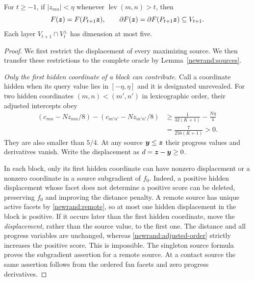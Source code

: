 {\begin{lemma}
\label{newrand:robust}
For $t\ge-1$, if $|z_{mn}|<\eta$ whenever
$\operatorname{lev}(m,n)>t$, then
\begin{equation}
 F(\bm{z})=F(P_{t+1}\bm{z}),\qquad
 \partial F(\bm{z})=\partial F(P_{t+1}\bm{z})\subseteq V_{t+1}.
 \label{newrand:robust-identity}
\end{equation}
Each layer $V_{t+1}\cap V_t^\perp$ has dimension at most five.
\end{lemma}
\begin{proof}
We first restrict the displacement of every maximizing source.
We then transfer these restrictions to the complete oracle by
Lemma~\ref{newrand:sources}.

\emph{Only the first hidden coordinate of a block can contribute.}
Call a coordinate hidden when its query value lies in $[-\eta,\eta]$
and it is designated unrevealed.  For two hidden coordinates $(m,n)<(m',n')$
in lexicographic order, their adjusted intercepts obey
\begin{equation}
\begin{aligned}
 (c_{mn}-Nz_{mn}/8)-(c_{m'n'}-Nz_{m'n'}/8)
 &\ge\frac1{32(K+1)}-\frac{N\eta}{4}\\
 &=\frac7{256(K+1)}>0.
\end{aligned}
 \label{newrand:adjusted-order}
\end{equation}
They are also smaller than $5/4$.  At any source $\bm{y}\le\bm{z}$ their
progress values and derivatives vanish.  Write the displacement as
$d=\bm{z}-\bm{y}\ge0$.

In each block, only its first hidden coordinate can have nonzero
displacement or a nonzero coordinate in a source subgradient of $f_0$.
Indeed, a positive hidden displacement whose facet does not determine
a positive score can be deleted, preserving $f_0$ and improving the
distance penalty.  A remote source has unique active facets by
\eqref{newrand:remote}, so at most one hidden displacement in the block
is positive.  If it occurs later than the first hidden coordinate,
move the \emph{displacement}, rather than the source value, to the
first one.  The distance and all progress variables are unchanged,
whereas \eqref{newrand:adjusted-order} strictly increases the positive
score.  This is impossible.  The singleton source formula proves
the subgradient assertion for a remote source.  At a contact source
the same assertion follows from the ordered fan facets and zero
progress derivatives.


\end{proof}}
